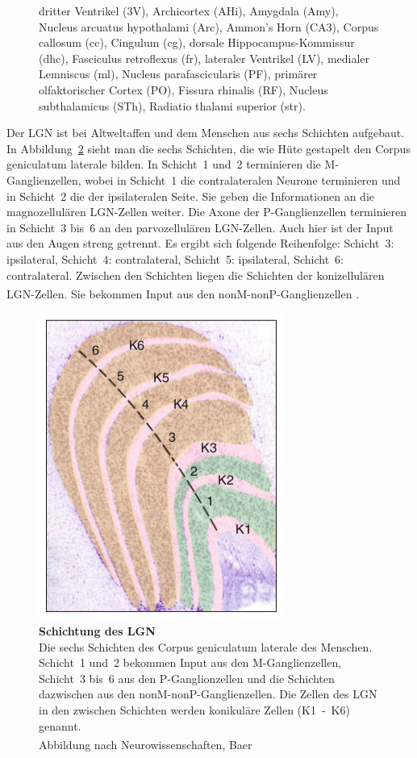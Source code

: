 \documentclass[12pt,a4paper,pdftex]{article}
\begin{document}
\begin{figure}[H]
{    dritter Ventrikel (3V), Archicortex (AHi), Amygdala (Amy), Nucleus arcuatus hypothalami (Arc), Ammon's Horn (CA3), Corpus callosum (cc), Cingulum (cg), dorsale Hippocampus-Kommissur (dhc), Fasciculus retroflexus (fr), lateraler Ventrikel (LV), medialer Lemniscus (ml), Nucleus parafascicularis (PF),  primärer  olfaktorischer  Cortex (PO), Fissura rhinalis (RF), Nucleus subthalamicus (STh), Radiatio thalami superior (str).}
    \label{fig:LGN}
\end{figure}

Der LGN ist bei Altweltaffen und dem Menschen aus sechs Schichten aufgebaut. 
In Abbildung~\ref{fig:schichtung-LGN} sieht man die sechs Schichten, die wie Hüte gestapelt den Corpus geniculatum laterale bilden. In Schicht~1 und~2 terminieren die M-Ganglienzellen, wobei in Schicht~1 die contralateralen Neurone terminieren und in Schicht~2 die der ipsilateralen Seite. Sie geben die Informationen an die magnozellulären LGN-Zellen weiter. Die Axone der P-Ganglienzellen terminieren in Schicht~3 bis~6 an den parvozellulären LGN-Zellen. Auch hier ist der Input aus den Augen streng getrennt. Es ergibt sich folgende Reihenfolge: Schicht~3: ipsilateral, Schicht~4: contralateral, Schicht~5: ipsilateral, Schicht~6: contralateral.
Zwischen den Schichten liegen die Schichten der konizellulären LGN-Zellen. Sie bekommen Input aus den nonM-nonP-Ganglienzellen \textsuperscript{\cite[9.7]{heldmaier2003tierphysiologie}}.

\begin{figure}[H]
    \centering
    \includegraphics{pictures/visual/LGN_baer.png}
    \caption[Schichtung des LGN]{\textbf{Schichtung des LGN}\\
    Die sechs Schichten des Corpus geniculatum laterale des Menschen. Schicht~1 und~2 bekommen Input aus den M-Ganglienzellen, Schicht~3 bis~6 aus den P-Ganglionzellen und die Schichten dazwischen aus den nonM-nonP-Ganglienzellen. Die Zellen des LGN in den zwischen Schichten werden konikuläre Zellen (K1~-~K6) genannt.\\
    Abbildung nach Neurowissenschaften, Baer \textsuperscript{\cite[10]{neurowissenschaften_baer}}}
    \label{fig:schichtung-LGN}
\end{figure} 
\end{document}
